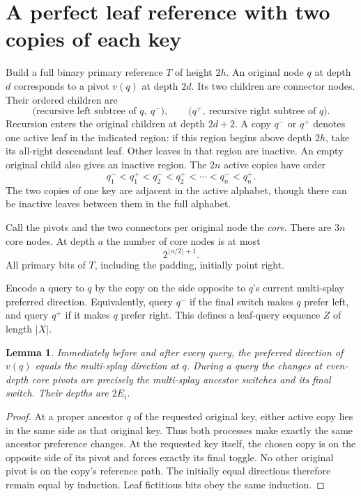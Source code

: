 \documentclass[11pt]{article}
\newtheorem{lemma}[theorem]{Lemma}
\begin{document}
\section{A perfect leaf reference with two copies of each key}

Build a full binary primary reference $T$ of height $2h$. An original
node $q$ at depth $d$ corresponds to a pivot $v(q)$ at depth $2d$.
Its two children are connector nodes. Their ordered children are
\[
 \bigl(\text{recursive left subtree of }q,\ q^-\bigr),
 \qquad
 \bigl(q^+,\ \text{recursive right subtree of }q\bigr).
\]
Recursion enters the original children at depth $2d+2$. A copy $q^-$
or $q^+$ denotes one active leaf in the indicated region: if this
region begins above depth $2h$, take its all-right descendant leaf.
Other leaves in that region are inactive. An empty original child
also gives an inactive region. The $2n$ active copies have order
\[
 q_1^-<q_1^+<q_2^-<q_2^+<\cdots<q_n^-<q_n^+.
\]
The two copies of one key are adjacent in the active alphabet, though
there can be inactive leaves between them in the full alphabet.

Call the pivots and the two connectors per original node the
\emph{core}. There are $3n$ core nodes. At depth $a$ the number of core
nodes is at most
\begin{equation}\label{eq:core-level}
 2^{\lfloor a/2\rfloor+1}.
\end{equation}
All primary bits of $T$, including the padding, initially point right.

Encode a query to $q$ by the copy on the side opposite to $q$'s current
multi-splay preferred direction. Equivalently, query $q^-$ if the final
switch makes $q$ prefer left, and query $q^+$ if it makes $q$ prefer
right. This defines a leaf-query sequence $Z$ of length $|X|$.

\begin{lemma}\label{lem:core}
Immediately before and after every query, the preferred direction of
$v(q)$ equals the multi-splay direction at $q$. During a query the
changes at even-depth core pivots are precisely the multi-splay ancestor
switches and its final switch. Their depths are $2E_i$.
\end{lemma}
\begin{proof}
At a proper ancestor $q$ of the requested original key, either active
copy lies in the same side as that original key. Thus both processes
make exactly the same ancestor preference changes. At the requested
key itself, the chosen copy is on the opposite side of its pivot and
forces exactly its final toggle. No other original pivot is on the
copy's reference path. The initially equal directions therefore remain
equal by induction. Leaf fictitious bits obey the same induction.
\end{proof}
\end{document}
